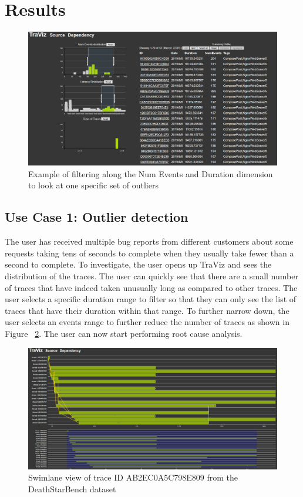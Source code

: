 \section{Results}

\begin{figure}
    \centering
    \includegraphics[width=\textwidth]{fig/outlier}
    \caption{Example of filtering along the Num Events and Duration dimension to look at one specific set of outliers}
    \label{fig:outlier}
\end{figure}

\subsection{Use Case 1: Outlier detection}

The user has received multiple bug reports from different customers
about some requests taking tens of seconds to complete when they
usually take fewer than a second to complete. To investigate, the
user opens up TraViz and sees the distribution of the traces. The
user can quickly see that there are a small number of traces
that have indeed taken unusually long as compared to other traces.
The user selects a specific duration range to filter so that
they can only see the list of traces that have their duration
within that range. To further narrow down, the user selects
an events range to further reduce the number of traces as shown
in Figure ~\ref{fig:outlier}. The user can now start performing
root cause analysis.

\begin{figure}
    \centering
    \includegraphics[width=\textwidth]{fig/swimlane}
    \caption{Swimlane view of trace ID AB2EC0A5C798E809 from the DeathStarBench dataset}
    \label{fig:outlier}
\end{figure}

